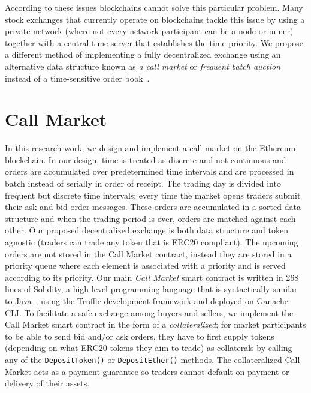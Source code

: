 According to these issues blockchains cannot solve this particular problem. Many stock exchanges that currently operate on blockchains tackle this issue by using a private network (where not every network participant can be a node or miner) together with a central time-server that establishes the time priority. We propose a different method of implementing a fully decentralized exchange using an alternative data structure known as \textit{a call market} or \textit{frequent batch auction} instead of a time-sensitive order book~\cite{clark2014decentralizing}.



\section{Call Market}\label{sec:callmarket}

In this research work, we design and implement a call market on the Ethereum blockchain. In our design, time is treated as discrete and not continuous and orders are accumulated over predetermined time intervals and are processed in batch instead of serially in order of receipt. The trading day is divided into frequent but discrete time intervals; every time the market opens traders submit their ask and bid order messages. These orders are accumulated in a sorted data structure and when the trading period is over, orders are matched against each other.  Our proposed decentralized exchange is both data structure and token agnostic (traders can trade any token that is ERC20 compliant). The upcoming orders are not stored in the Call Market contract, instead they are stored in a priority queue where each element is associated with a priority and is served according to its priority. Our main \textit{Call Market} smart contract is written in 268 lines of Solidity, a high level programming language that is syntactically similar to Java~\cite{Ethereum41:online}, using the Truffle development framework and deployed on Ganache-CLI. To facilitate a safe exchange among buyers and sellers, we implement the Call Market smart contract in the form of a \textit{collateralized}; for market participants to be able to send bid and/or ask orders, they have to first supply tokens (depending on what ERC20 tokens they aim to trade) as collaterals by calling any of the  \texttt{DepositToken()} or \texttt{DepositEther()} methods. The collateralized Call Market acts as a payment guarantee so traders cannot default on payment or delivery of their assets. 


